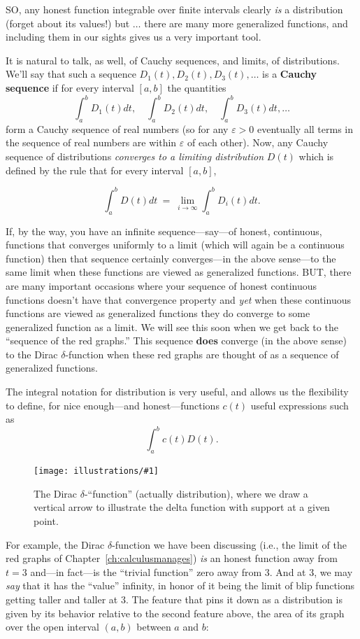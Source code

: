 \documentclass[openany]{book}
\newcommand{\ill}[3]{%
   \begin{figure}[H]%
   \vspace{-2ex}
   \centering%
   \texttt{[image: illustrations/\#1]}%
   \caption{#3}%
   \vspace{-2ex}
    \end{figure}}
\theoremstyle{plain}
\theoremstyle{definition}
\begin{document}
{ SO, any honest function integrable over finite intervals clearly {\it
   is} a distribution (forget about its values!) but $\dots$ there are
 many more generalized functions, and including them in our sights
 gives us a very important tool.


 It is natural to talk, as well, of Cauchy sequences, and limits, of
 distributions. We'll say that such a sequence $D_1(t), D_2(t),
 D_3(t),\dots$ is a {\bf Cauchy sequence} if for every interval
 $[a,b]$ the quantities $$\int_a^bD_1(t)dt,\quad
 \int_a^bD_2(t)dt,\quad\int_a^bD_3(t)dt,\dots$$ form a Cauchy sequence
 of real numbers (so for any $\varepsilon>0$ eventually all terms
 in the sequence of real numbers
 are within $\varepsilon$ of each other).
 Now, any Cauchy sequence of distributions {\it
   converges to a limiting distribution} $D(t)$ which is defined by
 the rule that for every interval $[a,b]$,

  $$ \int_a^bD(t)dt\ =\ \lim_{i \to \infty} \int_a^bD_i(t)dt.$$


  If, by the way, you have an infinite sequence---say---of honest,
  continuous, functions that converges uniformly to a limit (which
  will again be a continuous function) then that sequence certainly
  converges---in the above sense---to the same limit when these
  functions are viewed as generalized functions. BUT, there are many
  important occasions where your sequence of honest continuous
  functions doesn't have that convergence property and {\it yet} when
  these continuous functions are viewed as generalized functions they do converge to some
  generalized function as a limit. We will see this soon when we get
  back to the ``sequence of the red graphs.'' This sequence {\bf does}
  converge (in the above sense) to the Dirac $\delta$-function when
  these red graphs are thought of as a sequence of generalized
  functions.




  The integral notation for distribution is very useful, and allows us
  the flexibility to define, for nice enough---and honest---functions
  $c(t)$ useful expressions such as $$\int_a^bc(t)D(t).$$

 \ill{dirac_delta}{0.5}{The Dirac $\delta$-``function'' (actually
   distribution),\index{distribution} where we draw a vertical arrow to illustrate the
   delta function with support at a given point.}

 For example, the Dirac $\delta$-function we have been discussing
 (i.e., the limit of the red graphs of Chapter~\ref{ch:calculusmanages}) {\it is}
 an honest function away from $t=3$ and---in fact---is the ``trivial
 function'' zero away from $3$.  And at $3$, we may {\it say}
 that it has the ``value'' infinity, in honor of it being the limit of
 blip functions getting taller and taller at $3$. The feature that
 pins it down as a distribution is given by its behavior relative to
 the second feature above, the area of its graph over the open
 interval $(a,b)$ between $a$ and $b$:

}
\end{document}

